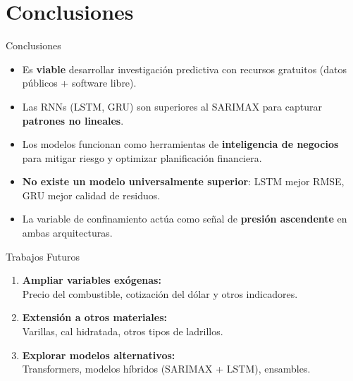 \documentclass[12pt, aspectratio=169]{beamer}
\begin{document}
\section{Conclusiones}

\begin{frame}{Conclusiones}
\begin{itemize}
  \item Es \textbf{viable} desarrollar investigaci\'on predictiva con recursos gratuitos (datos p\'ublicos + software libre).

  \vspace{0.15cm}
  \item Las RNNs (LSTM, GRU) son superiores al SARIMAX para capturar \textbf{patrones no lineales}.

  \vspace{0.15cm}
  \item Los modelos funcionan como herramientas de \textbf{inteligencia de negocios} para mitigar riesgo y optimizar planificaci\'on financiera.

  \vspace{0.15cm}
  \item \textbf{No existe un modelo universalmente superior}: LSTM mejor RMSE, GRU mejor calidad de residuos.

  \vspace{0.15cm}
  \item La variable de confinamiento act\'ua como se\~nal de \textbf{presi\'on ascendente} en ambas arquitecturas.
\end{itemize}
\end{frame}

\begin{frame}{Trabajos Futuros}
\begin{enumerate}
  \item \textbf{Ampliar variables ex\'ogenas:}\\
  Precio del combustible, cotizaci\'on del d\'olar y otros indicadores.

  \vspace{0.4cm}
  \item \textbf{Extensi\'on a otros materiales:}\\
  Varillas, cal hidratada, otros tipos de ladrillos.

  \vspace{0.4cm}
  \item \textbf{Explorar modelos alternativos:}\\
  Transformers, modelos h\'ibridos (SARIMAX + LSTM), ensambles.
\end{enumerate}
\end{frame}
\end{document}
